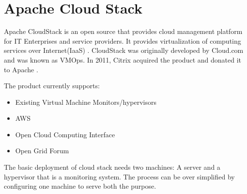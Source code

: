 \section{Apache Cloud Stack}

Apache CloudStack is an open source that provides cloud management platform for IT
Enterprises and service providers. 
It provides virtualization of computing services over Internet(IaaS)
\cite{ hid-sp18-417-techtarget-cloudStack}. 
CloudStack was originally developed by Cloud.com and was known as VMOps. 
In 2011, Citrix acquired the product and donated it to Apache 
\cite{ hid-sp18-417-wiki-cloudstack}. 

The product currently supports:
\begin{itemize}
\item        Existing Virtual Machine Monitors/hypervisors
\item        AWS
\item        Open Cloud Computing Interface
\item        Open Grid Forum
\end{itemize}
 The basic deployment of cloud stack needs two machines: 
 A server and a hypervisor that is a monitoring system. 
 The process can be over simplified by configuring one machine 
 to serve both the purpose\cite{ hid-sp18-417-doc-cloudstack}.
